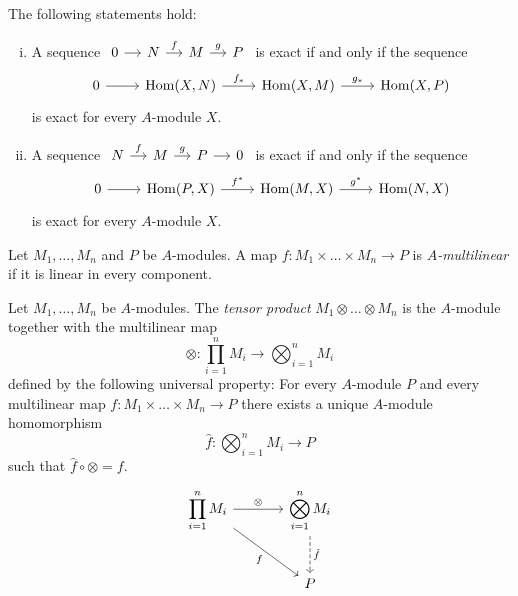 \begin{lema}
\label{rings:lm:hom_ex}
The following statements hold:

\begin{enumerate}[i)]
\item A sequence
$\begin{tikzcd}[column sep=small]
0 \arrow[r] &
N \arrow[r, "f"] &
M \arrow[r, "g"] &
P
\end{tikzcd}$
is exact if and only if the sequence
\[
\begin{tikzcd}
0 \arrow[r] &
\Hom(X, N) \arrow[r, "f_*"] &
\Hom(X, M) \arrow[r, "g_*"] &
\Hom(X, P)
\end{tikzcd}
\]
is exact for every $A$-module $X$.
\item A sequence
$\begin{tikzcd}[column sep=small]
N \arrow[r, "f"] &
M \arrow[r, "g"] &
P \arrow[r] &
0
\end{tikzcd}$
is exact if and only if the sequence
\[
\begin{tikzcd}
0 \arrow[r] &
\Hom(P, X) \arrow[r, "f^*"] &
\Hom(M, X) \arrow[r, "g^*"] &
\Hom(N, X)
\end{tikzcd}
\]
is exact for every $A$-module $X$.
\end{enumerate}
\end{lema}


\begin{definicija}
Let $M_1, \dots, M_n$ and $P$ be $A$-modules. A map
$f \colon M_1 \times \dots \times M_n \to P$ is
\emph{$A$-multilinear} if it is linear in
every component.
\end{definicija}

\begin{definicija}
Let $M_1, \dots, M_n$ be $A$-modules. The
\emph{tensor product}
$M_1 \otimes \dots \otimes M_n$ is the $A$-module together with
the multilinear map
\[
\otimes \colon \prod_{i=1}^n M_i \to \bigotimes_{i=1}^n M_i
\]
defined by the following universal property:
For every $A$-module
$P$ and every multilinear map
$f \colon M_1 \times \dots \times M_n \to P$ there exists a unique
$A$-module homomorphism
\[
\hat{f} \colon \bigotimes_{i=1}^n M_i \to P
\]
such that $\hat{f} \circ \otimes = f$.
\[
\begin{tikzcd}[row sep=large, column sep=large]
\displaystyle
\prod_{i=1}^n M_i \arrow[r, "\otimes"] \arrow[dr, "f"'] &
\displaystyle
\bigotimes_{i=1}^n M_i \arrow[d, dashed, "\hat{f}"] \\ &
P
\end{tikzcd}
\]
\end{definicija}


